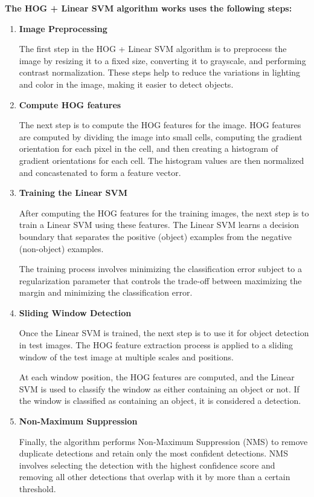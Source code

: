         \textbf{The HOG + Linear SVM algorithm works uses the following steps:}
        \begin{enumerate}

            \item \textbf{Image Preprocessing}
        
            The first step in the HOG + Linear SVM algorithm is to preprocess the image by resizing it to a fixed size, converting it to grayscale, and performing contrast normalization. 
            These steps help to reduce the variations in lighting and color in the image, making it easier to detect objects.
            
            \item \textbf{Compute HOG features}
        
            The next step is to compute the HOG features for the image. 
            HOG features are computed by dividing the image into small cells, computing the gradient orientation for each pixel in the cell, and then creating a histogram of gradient orientations for each cell. 
            The histogram values are then normalized and concastenated to form a feature vector.

            \item \textbf{Training the Linear SVM}
        
            After computing the HOG features for the training images, the next step is to train a Linear SVM using these features. 
            The Linear SVM learns a decision boundary that separates the positive (object) examples from the negative (non-object) examples.
        
            The training process involves minimizing the classification error subject to a regularization parameter that controls the trade-off between maximizing the margin and minimizing the classification error.
        
            \item \textbf{Sliding Window Detection}
        
            Once the Linear SVM is trained, the next step is to use it for object detection in test images. 
            The HOG feature extraction process is applied to a sliding window of the test image at multiple scales and positions.
        
            At each window position, the HOG features are computed, and the Linear SVM is used to classify the window as either containing an object or not. 
            If the window is classified as containing an object, it is considered a detection.

            \item \textbf{Non-Maximum Suppression}
        
            Finally, the algorithm performs Non-Maximum Suppression (NMS) to remove duplicate detections and retain only the most confident detections. 
            NMS involves selecting the detection with the highest confidence score and removing all other detections that overlap with it by more than a certain threshold.

        \end{enumerate}

